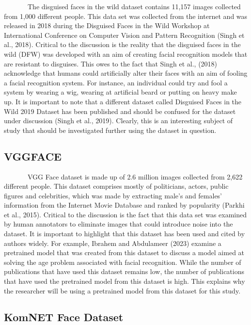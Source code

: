\documentclass[
  12pt,
]{report}
\begin{document}
~~~~~~~The disguised faces in the wild dataset contains 11,157 images
collected from 1,000 different people. This data set was collected from
the internet and was released in 2018 during the Disguised Faces in the
Wild Workshop at International Conference on Computer Vision and Pattern
Recognition (Singh et al., 2018). Critical to the discussion is the
reality that the disguised faces in the wild (DFW) was developed with an
aim of creating facial recognition models that are resistant to
disguises. This owes to the fact that Singh et al., (2018) acknowledge
that humans could artificially alter their faces with an aim of fooling
a facial recognition system. For instance, an individual could try and
fool a system by wearing a wig, wearing at artificial beard or putting
on heavy make up. It is important to note that a different dataset
called Disguised Faces in the Wild 2019 Dataset has been published and
should be confused for the dataset under discussion (Singh et al.,
2019). Clearly, this is an interesting subject of study that should be
investigated further using the dataset in question.

\subsection{VGGFACE}\label{vggface}

~~~~~~~VGG Face dataset is made up of 2.6 million images collected from
2,622 different people. This dataset comprises mostly of politicians,
actors, public figures and celebrities, which was made by extracting
male's and females' information from the Internet Movie Database and
ranked by popularity (Parkhi et al., 2015). Critical to the discussion
is the fact that this data set was examined by human annotators to
eliminate images that could introduce noise into the dataset. It is
important to highlight that this dataset has been used and cited by
authors widely. For example, Ibrahem and Abdulameer (2023) examine a
pretrained model that was created from this dataset to discuss a model
aimed at solving the age problem associated with facial recognition.
While the number of publications that have used this dataset remains
low, the number of publications that have used the pretrained model from
this dataset is high. This explains why the researcher will be using a
pretrained model from this dataset for this study.

\subsection{KomNET Face Dataset}\label{komnet-face-dataset}
\end{document}

